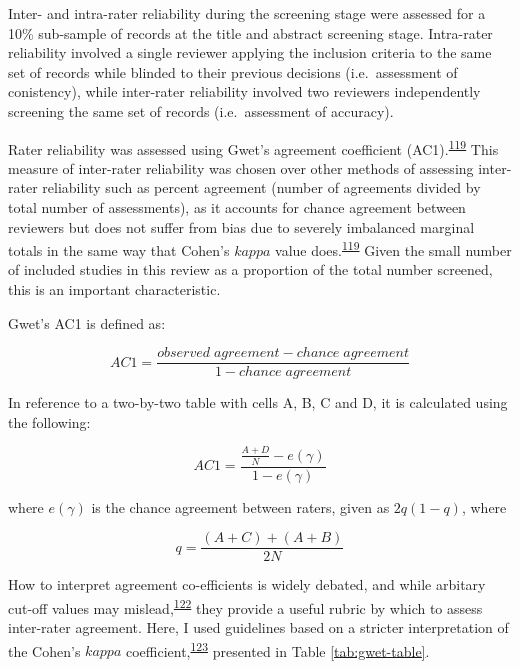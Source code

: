\documentclass[a4paper, twoside]{templates/ociamthesis}
\begin{document}
Inter- and intra-rater reliability during the screening stage were assessed for a 10\% sub-sample of records at the title and abstract screening stage. Intra-rater reliability involved a single reviewer applying the inclusion criteria to the same set of records while blinded to their previous decisions (i.e.~assessment of conistency), while inter-rater reliability involved two reviewers independently screening the same set of records (i.e.~assessment of accuracy).

Rater reliability was assessed using Gwet's agreement coefficient (AC1).\textsuperscript{\protect\hyperlink{ref-gwet2008}{119}} This measure of inter-rater reliability was chosen over other methods of assessing inter-rater reliability such as percent agreement (number of agreements divided by total number of assessments), as it accounts for chance agreement between reviewers but does not suffer from bias due to severely imbalanced marginal totals in the same way that Cohen's \(kappa\) value does.\textsuperscript{\protect\hyperlink{ref-gwet2008}{119}} Given the small number of included studies in this review as a proportion of the total number screened, this is an important characteristic.

Gwet's AC1 is defined as:

\[AC1 = \frac{observed\;agreement-chance\;agreement}{1-chance\;agreement}\]

In reference to a two-by-two table with cells A, B, C and D, it is calculated using the following:

\begin{equation}
  AC1 = \frac{\frac{A+D}{N}-e(\gamma)}{1-e(\gamma)}
  \label{eq:AC1-main}
\end{equation}

where \(e(\gamma)\) is the chance agreement between raters, given as \(2q(1-q)\), where

\begin{equation}
  q = \frac{(A+C)+(A+B)}{2N}
  \label{eq:AC1-supp}
\end{equation}

How to interpret agreement co-efficients is widely debated, and while arbitary cut-off values may mislead,\textsuperscript{\protect\hyperlink{ref-brennan1992}{122}} they provide a useful rubric by which to assess inter-rater agreement. Here, I used guidelines based on a stricter interpretation of the Cohen's \(kappa\) coefficient,\textsuperscript{\protect\hyperlink{ref-mchugh2012}{123}} presented in Table \ref{tab:gwet-table}.
\end{document}
